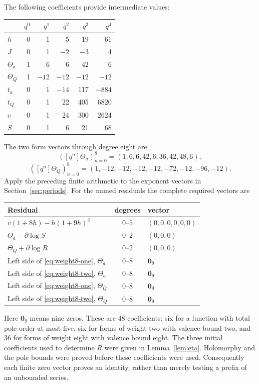 \documentclass[11pt,a4paper]{article}
\theoremstyle{remark}
\newcommand{\dd}{\partial}
\begin{document}
The following coefficients provide intermediate values:
\begin{center}\small
\begin{tabular}{@{}lrrrrr@{}}\toprule
 & $q^0$&$q^1$&$q^2$&$q^3$&$q^4$\\\midrule
$h$&0&1&5&19&61\\
$J$&0&1&$-2$&$-3$&4\\
$\Theta_a$&1&6&6&42&6\\
$\Theta_Q$&1&$-12$&$-12$&$-12$&$-12$\\
$t_a$&0&1&$-14$&117&$-884$\\
$t_Q$&0&1&22&405&6820\\
$v$&0&1&24&300&2624\\
$S$&0&1&6&21&68\\\bottomrule
\end{tabular}
\end{center}
The two form vectors through degree eight are
\[
 ([q^n]\Theta_a)_{n=0}^8=(1,6,6,42,6,36,42,48,6),
\]
\[
 ([q^n]\Theta_Q)_{n=0}^8=(1,-12,-12,-12,-12,-72,-12,-96,-12).
\]
Apply the preceding finite arithmetic to the exponent vectors in
Section~\ref{sec:periods}. For the named residuals the complete
required vectors are
\begin{center}\small
\begin{tabular}{@{}p{}cl@{}}\toprule
Residual&degrees&vector\\\midrule
$v(1+8h)-h(1+9h)^3$&$0$--$5$&$(0,0,0,0,0,0)$\\
$\Theta_a-\dd\log S$&$0$--$2$&$(0,0,0)$\\
$\Theta_Q+\dd\log R$&$0$--$2$&$(0,0,0)$\\
Left side of \eqref{eq:weight8-one}, $\Theta_a$&$0$--$8$&$\mathbf0_9$\\
Left side of \eqref{eq:weight8-two}, $\Theta_a$&$0$--$8$&$\mathbf0_9$\\
Left side of \eqref{eq:weight8-one}, $\Theta_Q$&$0$--$8$&$\mathbf0_9$\\
Left side of \eqref{eq:weight8-two}, $\Theta_Q$&$0$--$8$&$\mathbf0_9$\\\bottomrule
\end{tabular}
\end{center}
Here $\mathbf0_9$ means nine zeros. These are $48$ coefficients:
six for a function with total pole order at most five, six for forms
of weight two with valence bound two, and $36$ for forms of weight
eight with valence bound eight. The three initial coefficients used
to determine $R$ were given in Lemma~\ref{lem:eta}.
Holomorphy and the pole bounds were proved before these coefficients
were used. Consequently each finite zero vector proves an identity,
rather than merely testing a prefix of an unbounded series.
\end{document}
